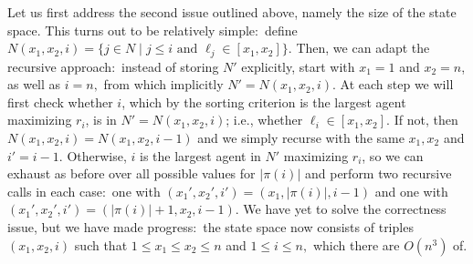 \documentclass[a4paper,UKenglish,cleveref, autoref, thm-restate]{lipics-v2021}
\newcommand{\set}[1]{\{#1\}}
\newcommand{\modulus}[1]{\vert #1 \vert}
\begin{document}
Let us first address the second issue outlined above, namely the size of the state space. This turns out to be relatively simple:~define $N(x_1, x_2, i) = \set{j \in N \mid j \leq i \text{ and } \ell_j \in [x_1, x_2]}.$ Then, we can adapt the recursive approach:~instead of storing $N'$ explicitly, start with $x_1 = 1$ and $x_2 = n$, as well as $i = n,$ from which implicitly $N' = N(x_1, x_2, i)$. At each step we will first check whether $i$, which by the sorting criterion is the largest agent maximizing $r_i$, is in $N' = N(x_1, x_2, i)$; i.e., whether $\ell_i \in [x_1, x_2].$ If not, then $N(x_1, x_2, i)=N(x_1,x_2,i-1)$ and we simply recurse with the same $x_1, x_2$ and $i' = i - 1.$ Otherwise, $i$ is the largest agent in $N'$ maximizing $r_i$, so we can exhaust as before over all possible values for $\modulus{\pi(i)}$ and perform two recursive calls in each case:~one with $(x_1', x_2', i') = (x_1, \modulus{\pi(i)}, i - 1)$ and one with $(x_1', x_2', i') = (\modulus{\pi(i)} + 1, x_2, i - 1)$. We have yet to solve the correctness issue, but we have made progress:~the state space now consists of triples $(x_1, x_2, i)$ such that $1 \leq x_1 \leq x_2 \leq n$ and $1 \leq i \leq n,$ which there are $O(n^3)$ of. 
\end{document}

